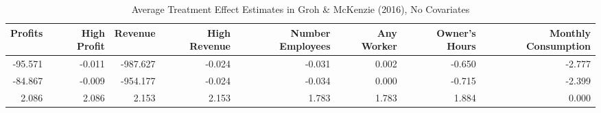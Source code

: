 \begin{table}[ht]
\centering
\begin{tabular}{rrrrrrrr}
  \hline
Profits & High Profit & Revenue & High Revenue & Number Employees & Any Worker & Owner's Hours & Monthly Consumption \\ 
  \hline
-95.571 & -0.011 & -987.627 & -0.024 & -0.031 & 0.002 & -0.650 & -2.777 \\ 
  -84.867 & -0.009 & -954.177 & -0.024 & -0.034 & 0.000 & -0.715 & -2.399 \\ 
  2.086 & 2.086 & 2.153 & 2.153 & 1.783 & 1.783 & 1.884 & 0.000 \\ 
  \end{tabular}
\caption{Average Treatment Effect Estimates in Groh \& McKenzie (2016), No Covariates} 
\end{table}
